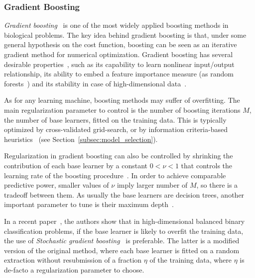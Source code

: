     \subsubsection{Gradient Boosting}
    \textit{Gradient boosting}~\citep{friedman2001greedy}  is one of the most widely applied boosting methods in biological problems.
    The key idea behind gradient boosting is that, under some general hypothesis on the cost function, boosting can be seen as an iterative gradient method for numerical optimization.
    Gradient boosting has several desirable properties~\citep{mayr2014evolution}, such as its capability to learn nonlinear input/output relationship, its ability to embed a feature importance measure (as random forests~\citep{hastie2009elements}) and its stability in case of high-dimensional data~\citep{buehlmann2006boosting}.


    As for any learning machine, boosting methods may suffer of overfitting. The main regularization parameter to control is the number of boosting iterations $M$, \ie the number of base learners, fitted on the training data. This is typically optimized by cross-validated grid-search, or by information criteria-based heuristics~\citep{tutz2006generalized, tutz2007boosting} (see Section~\ref{subsec:model_selection}).

    Regularization in gradient boosting can also be controlled by shrinking the contribution of each base learner by a constant $0<\nu<1$ that controls the learning rate of the boosting procedure~\citep{hastie2009elements}. In order to achieve comparable predictive power, smaller values of $\nu$ imply larger number of $M$, so there is a tradeoff between them.
    As usually the base learners are decision trees, another important parameter to tune is their maximum depth~\citep{hastie2009elements}.

    In a recent paper~\citep{lusa2015boosting}, the authors show that in high-dimensional balanced binary classification problems, if the base learner is likely to overfit the training data, the use of \textit{Stochastic gradient boosting}~\citep{friedman2002stochastic} is preferable. The latter is a modified version of the original method, where each base learner is fitted on a random extraction without resubmission of a fraction $\eta$ of the training data, where $\eta$ is de-facto a regularization parameter to choose.

